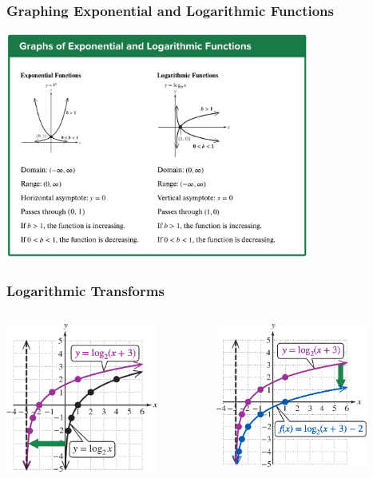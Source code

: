 \documentclass{beamer}
\begin{document}
\begin{frame}\frametitle{Graphing Exponential and Logarithmic Functions }

\begin{center}
\includegraphics[width=10cm]{fig/loggraph.jpg}
\end{center}

\end{frame}


\begin{frame}\frametitle{Logarithmic Transforms}
\begin{columns}
\begin{column}{6cm}


\begin{center}
\includegraphics[width=5cm]{fig/logtran1.png}
\end{center}


\end{column}

\begin{column}{6cm}

\begin{center}
\includegraphics[width=5cm]{fig/logtran2.png}
\end{center}

\end{column}
\end{columns}

\end{frame}
\end{document}
